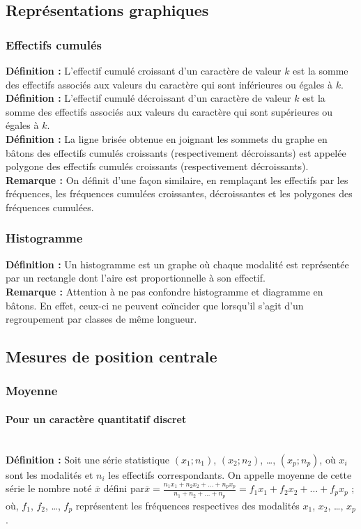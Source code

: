 \documentclass[a4paper,titlepage]{article}
\begin{document}
    \subsection{Représentations graphiques}
        \subsubsection{Effectifs cumulés}
            \textbf{Définition :} L’effectif cumulé croissant d’un caractère de valeur $k$ est la somme des effectifs associés aux valeurs du caractère qui sont inférieures ou égales à $k$.
            \\
            \textbf{Définition :} L’effectif cumulé décroissant d’un caractère de valeur $k$ est la somme des effectifs associés aux valeurs du caractère qui sont supérieures ou égales à $k$.
            \\
            \textbf{Définition :} La ligne brisée obtenue en joignant les sommets du graphe en bâtons des effectifs cumulés croissants (respectivement décroissants) est appelée polygone des effectifs cumulés croissants (respectivement décroissants).
            \\
            \textbf{Remarque :} On définit d’une façon similaire, en remplaçant les effectifs par les fréquences, les fréquences cumulées croissantes, décroissantes et les polygones des fréquences cumulées.
        \subsubsection{Histogramme}
            \textbf{Définition :} Un histogramme est un graphe où chaque modalité est représentée par un rectangle dont l’aire est proportionnelle à son effectif.
            \\
            \textbf{Remarque :} Attention à ne pas confondre histogramme et diagramme en bâtons. En effet, ceux-ci ne peuvent coïncider que lorsqu’il s’agit d’un regroupement par classes de même longueur.
    \subsection{Mesures de position centrale}
        \subsubsection{Moyenne}
            \paragraph{Pour un caractère quantitatif discret}\mbox{}\\
                \textbf{Définition :} Soit une série statistique $\left(x_{1};n_{1}\right)$, $\left(x_{2};n_{2}\right)$, \ldots, $\left(x_{p};n_{p}\right)$, où $x_{i}$ sont les modalités et $n_{i}$ les effectifs correspondants. On appelle moyenne de cette série le nombre noté $\overline{x}$ défini par\linebreak$\overline{x}=\frac{n_{1}x_{1}+n_{2}x_{2}+\ldots+n_{p}x_{p}}{n_{1}+n_{2}+\ldots+n_{p}}=f_{1}x_{1}+f_{2}x_{2}+\ldots+f_{p}x_{p}$ ; où, $f_{1}$, $f_{2}$, \ldots, $f_{p}$ représentent les fréquences respectives des modalités $x_{1}$, $x_{2}$, \ldots, $x_{p}$.
\end{document}
